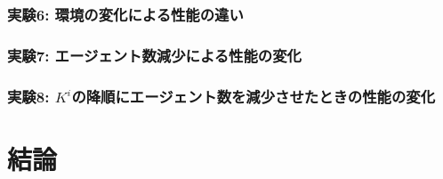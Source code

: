 \documentclass[12pt,a4j,twoside]{jarticle}
\begin{document}
  \subsubsection{実験6: 環境の変化による性能の違い}
  \label{ex:ERC2}  
  
  \subsubsection{実験7: エージェント数減少による性能の変化}

  \subsubsection{実験8: $K^i$の降順にエージェント数を減少させたときの性能の変化}

  \section{結論}

  \clearpage
  
  
\end{document}

